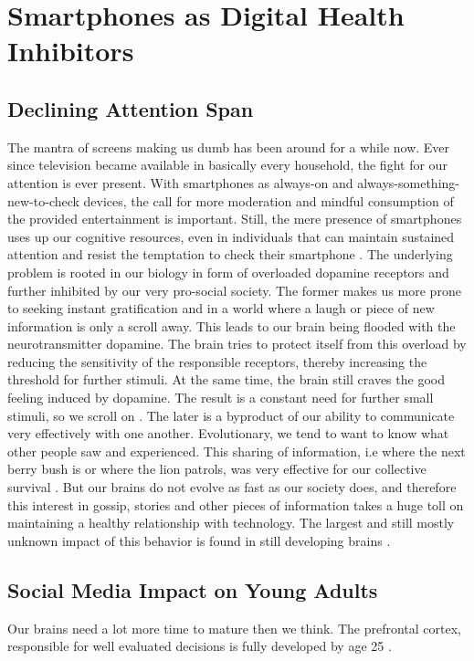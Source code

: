 \section{Smartphones as Digital Health Inhibitors}
\subsection{Declining Attention Span}
The mantra of screens making us dumb has been around for a while now. Ever since television became available in basically every household, the fight for our attention is ever present. With smartphones as always-on and always-something-new-to-check devices, the call for more moderation and mindful consumption of the provided entertainment is important. Still, the mere presence of smartphones uses up our cognitive resources, even in individuals that can maintain sustained attention and resist the temptation to check their smartphone \cite{ward2017brain}. The underlying problem is rooted in our biology in form of overloaded dopamine receptors and further inhibited by our very pro-social society. The former makes us more prone to seeking instant gratification and in a world where a laugh or piece of new information is only a scroll away. This leads to our brain being flooded with the neurotransmitter dopamine. The brain tries to protect itself from this overload by reducing the sensitivity of the responsible receptors, thereby increasing the threshold for further stimuli. At the same time, the brain still craves the good feeling induced by dopamine. The result is a constant need for further small stimuli, so we scroll on \cite{nieoullon2002dopamine,dopamineRole}. The later is a byproduct of our ability to communicate very effectively with one another. Evolutionary, we tend to want to know what other people saw and experienced. This sharing of information, i.e where the next berry bush is or where the lion patrols, was very effective for our collective survival \cite{sapiens}. But our brains do not evolve as fast as our society does, and therefore this interest in gossip, stories and other pieces of information takes a huge toll on maintaining a healthy relationship with technology. The largest and still mostly unknown impact of this behavior is found in still developing brains \cite{crone2018media}.
\subsection{Social Media Impact on Young Adults}
Our brains need a lot more time to mature then we think. The prefrontal cortex, responsible for well evaluated decisions is fully developed by age 25 \cite{prefrontalCortexDev}.

